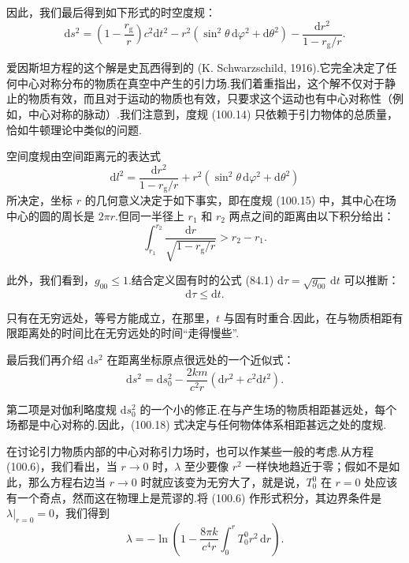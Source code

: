 因此，我们最后得到如下形式的时空度规：
\begin{equation}
  \mathrm{d}s^{2}=\left(1-\frac{r_{\mathrm{g}}}{r}\right)c^{2}\mathrm{d}t^{2}
  -r^{2}(\sin^{2}\theta\,\mathrm{d}\varphi^{2}+\mathrm{d}\theta^{2})
  -\frac{\mathrm{d}r^{2}}{1-r_{\mathrm{g}}/r}.
\end{equation}

爱因斯坦方程的这个解是史瓦西得到的 (K. Schwarzschild, 1916).它完全决定了任何中心对称分布的物质在真空中产生的引力场.我们着重指出，这个解不仅对于静止的物质有效，而且对于运动的物质也有效，只要求这个运动也有中心对称性（例如，中心对称的脉动）.我们注意到，度规 (100.14) 只依赖于引力物体的总质量，恰如牛顿理论中类似的问题.

空间度规由空间距离元的表达式
\begin{equation}
  \mathrm{d}l^{2}=\frac{\mathrm{d}r^{2}}{1-r_{\mathrm{g}}/r}
  +r^{2}(\sin^{2}\theta\,\mathrm{d}\varphi^{2}+\mathrm{d}\theta^{2})
\end{equation}
所决定，坐标 $r$ 的几何意义决定于如下事实，即在度规 (100.15) 中，其中心在场中心的圆的周长是 $2\pi r$.但同一半径上 $r_1$ 和 $r_2$ 两点之间的距离由以下积分给出：
\begin{equation}
  \int_{r_1}^{r_2}\frac{\mathrm{d}r}{\sqrt{1-r_{\mathrm{g}}/r}}
  >r_2-r_1.
\end{equation}

此外，我们看到，$g_{00}\leqslant1$.结合定义固有时的公式 (84.1) $\mathrm{d}\tau=\sqrt{g_{00}}\,\mathrm{d}t$ 可以推断：
\begin{equation}
  \mathrm{d}\tau\leqslant\mathrm{d}t.
\end{equation}

只有在无穷远处，等号方能成立，在那里，$t$ 与固有时重合.因此，在与物质相距有限距离处的时间比在无穷远处的时间“走得慢些”.

最后我们再介绍 $\mathrm{d}s^{2}$ 在距离坐标原点很远处的一个近似式：
\begin{equation}
  \mathrm{d}s^{2}=\mathrm{d}s_0^{2}
  -\frac{2km}{c^{2}r}(\mathrm{d}r^{2}+c^{2}\mathrm{d}t^{2}).
\end{equation}

第二项是对伽利略度规 $\mathrm{d}s_0^{2}$ 的一个小的修正.在与产生场的物质相距甚远处，每个场都是中心对称的.因此，(100.18) 式决定与任何物体体系相距甚远之处的度规.

在讨论引力物质内部的中心对称引力场时，也可以作某些一般的考虑.从方程 (100.6)，我们看出，当 $r\to0$ 时，$\lambda$ 至少要像 $r^{2}$ 一样快地趋近于零；假如不是如此，那么方程右边当 $r\to0$ 时就应该变为无穷大了，就是说，$T_0^0$ 在 $r=0$ 处应该有一个奇点，然而这在物理上是荒谬的.将 (100.6) 作形式积分，其边界条件是 $\lambda|_{r=0}=0$，我们得到
\begin{equation}
  \lambda=-\ln\left(1-\frac{8\pi k}{c^{4}r}
  \int_{0}^{r}T_0^0r^{2}\,\mathrm{d}r\right).
\end{equation}

